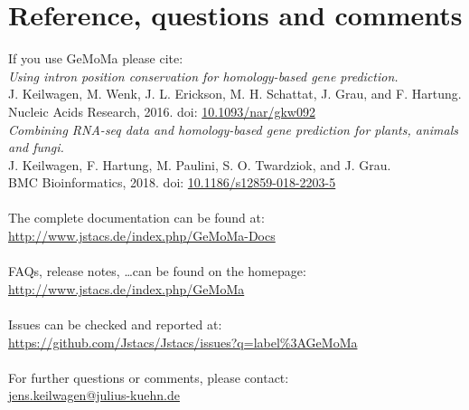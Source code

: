 \documentclass{article}
\begin{document}
\section{Reference, questions and comments}
If you use GeMoMa please cite:\\[\medskipamount]
\emph{Using intron position conservation for homology-based gene prediction.}\\
J. Keilwagen, M. Wenk, J. L. Erickson, M. H. Schattat, J. Grau, and F. Hartung.\\
Nucleic Acids Research, 2016. doi: \href{https://doi.org/10.1093/nar/gkw092}{10.1093/nar/gkw092}\\[\medskipamount]
\emph{Combining RNA-seq data and homology-based gene prediction for plants, animals and fungi.}\\
J. Keilwagen, F. Hartung, M. Paulini, S. O. Twardziok, and J. Grau.\\
BMC Bioinformatics, 2018. doi: \href{https://doi.org/10.1186/s12859-018-2203-5}{10.1186/s12859-018-2203-5}\\
~\\
The complete documentation can be found at:\\
\url{http://www.jstacs.de/index.php/GeMoMa-Docs}\\
~\\
FAQs, release notes, \ldots can be found on the homepage:\\
\url{http://www.jstacs.de/index.php/GeMoMa}\\
~\\
Issues can be checked and reported at:\\
\url{https://github.com/Jstacs/Jstacs/issues?q=label\%3AGeMoMa}\\

~\\
For further questions or comments, please contact:\\
\href{mailto:jens.keilwagen@julius-kuehn.de?subject=GeMoMa manual}{jens.keilwagen@julius-kuehn.de}
\end{document}
